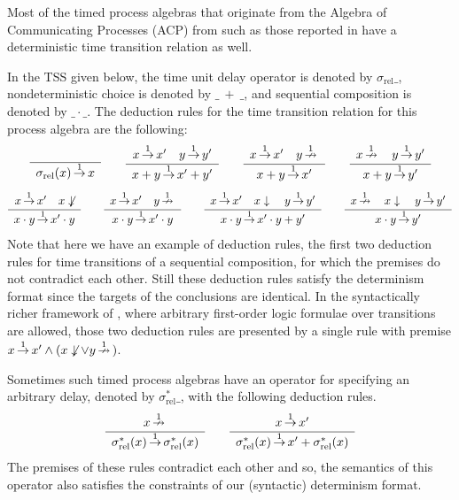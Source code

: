 \begin{example}\label{ex:timetrans2}
Most of the timed process algebras that originate from the Algebra of Communicating Processes (ACP) from \cite{Bergstra84,Baeten90} such as those reported in \cite{Baeten02} have a deterministic time transition relation as well.

In the TSS given below, the time unit delay operator is denoted by $\sigma_{\mathrm{rel}} \_$, nondeterministic choice is denoted by $\_~+~\_$,
and sequential composition is denoted by $\_ \cdot \_$.
The deduction rules for the time transition relation for this process algebra are the following:
\[ \sosrule{}{\sigma_{\mathrm{rel}}(x) \trans{1} x}
\qquad
\sosrule{x \trans{1} x' \quad y \trans{1} y'}{x + y \trans{1} x'+y'}
\qquad
\sosrule{x \trans{1} x' \quad y \ntrans{1} }{x + y \trans{1} x'}
\qquad
\sosrule{x \ntrans{1} \quad y \trans{1} y'}{x + y \trans{1} y'}
\]
\[
\sosrule{x \trans{1} x' \quad x \not\downarrow}{x \cdot y \trans{1} x' \cdot y}
\qquad
\sosrule{x \trans{1} x' \quad y \ntrans{1}}{x \cdot y \trans{1} x' \cdot y}
\qquad
\sosrule{x \trans{1} x' \quad x \downarrow \quad y \trans{1} y'}{x \cdot y \trans{1} x' \cdot y + y'}
\qquad
\sosrule{x \ntrans{1} \quad x \downarrow \quad y \trans{1} y'}{x \cdot y \trans{1} y'}
\]
Note that here we have an example of deduction rules, the first two deduction rules for time transitions of a sequential composition, for which the premises do not contradict each other. Still these deduction rules satisfy the determinism format since the targets of the conclusions are identical. In the syntactically richer framework of \cite{Reniers08}, where arbitrary first-order logic formulae over transitions are allowed, those two deduction rules are presented by a single rule with premise $x \,{\stackrel{{1}}{\rightarrow}}\, x' \land (x \not\downarrow \lor y \,{\stackrel{{1}}{\nrightarrow}}\,)$.

Sometimes such timed process algebras have an operator for specifying an arbitrary delay, denoted by $\sigma^*_{\mathrm{rel}} \_$, with the following deduction rules.
\[ \sosrule{x \ntrans{1}}{\sigma^*_{\mathrm{rel}}(x) \trans{1} \sigma^*_{\mathrm{rel}}(x)}
\qquad
\sosrule{x \trans{1} x'}{\sigma^*_{\mathrm{rel}}(x) \trans{1} x' + \sigma^*_{\mathrm{rel}}(x)}
\]
The premises of these rules contradict each other and so, the semantics of this operator also satisfies the constraints of our (syntactic)
determinism format.
\end{example}
